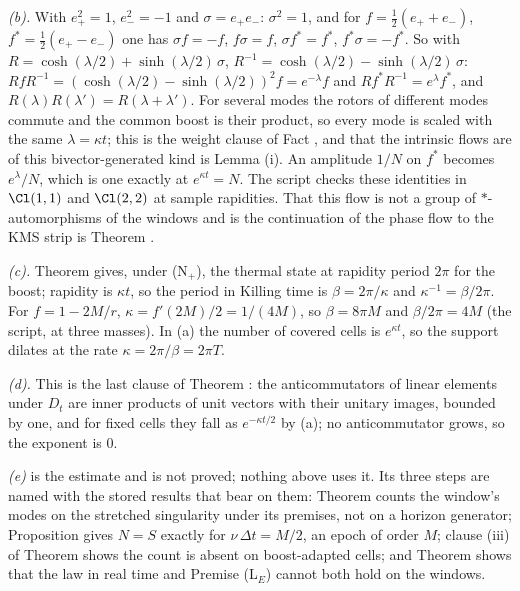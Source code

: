 \emph{(b).} With $e_{+}^{2} = 1$, $e_{-}^{2} = -1$ and $\sigma = e_{+}e_{-}$: $\sigma^{2} = 1$, and for $f = \tfrac12(e_{+} + e_{-})$, $f^{*} = \tfrac12(e_{+} - e_{-})$ one has $\sigma f = -f$, $f\sigma = f$, $\sigma f^{*} = f^{*}$, $f^{*}\sigma = -f^{*}$. So with $R = \cosh(\lambda/2) + \sinh(\lambda/2)\,\sigma$, $R^{-1} = \cosh(\lambda/2) - \sinh(\lambda/2)\,\sigma$: $RfR^{-1} = (\cosh(\lambda/2) - \sinh(\lambda/2))^{2}f = e^{-\lambda}f$ and $Rf^{*}R^{-1} = e^{\lambda}f^{*}$, and $R(\lambda)R(\lambda') = R(\lambda + \lambda')$. For several modes the rotors of different modes commute and the common boost is their product, so every mode is scaled with the same $\lambda = \kappa t$; this is the weight clause of Fact , and that the intrinsic flows are of this bivector-generated kind is Lemma (i). An amplitude $1/N$ on $f^{*}$ becomes $e^{\lambda}/N$, which is one exactly at $e^{\kappa t} = N$. The script checks these identities in $\Cl(1,1)$ and $\Cl(2,2)$ at sample rapidities. That this flow is not a group of $*$-automorphisms of the windows and is the continuation of the phase flow to the KMS strip is Theorem .

\emph{(c).} Theorem  gives, under (N$_{+}$), the thermal state at rapidity period $2\pi$ for the boost; rapidity is $\kappa t$, so the period in Killing time is $\beta = 2\pi/\kappa$ and $\kappa^{-1} = \beta/2\pi$. For $f = 1 - 2M/r$, $\kappa = f'(2M)/2 = 1/(4M)$, so $\beta = 8\pi M$ and $\beta/2\pi = 4M$ (the script, at three masses). In (a) the number of covered cells is $e^{\kappa t}$, so the support dilates at the rate $\kappa = 2\pi/\beta = 2\pi T$.

\emph{(d).} This is the last clause of Theorem : the anticommutators of linear elements under $D_{t}$ are inner products of unit vectors with their unitary images, bounded by one, and for fixed cells they fall as $e^{-\kappa t/2}$ by (a); no anticommutator grows, so the exponent is $0$.

\emph{(e)} is the estimate and is not proved; nothing above uses it. Its three steps are named with the stored results that bear on them: Theorem  counts the window's modes on the stretched singularity under its premises, not on a horizon generator; Proposition  gives $N = S$ exactly for $\nu\,\Delta t = M/2$, an epoch of order $M$; clause (iii) of Theorem  shows the count is absent on boost-adapted cells; and Theorem  shows that the law in real time and Premise (L$_{E}$) cannot both hold on the windows.
